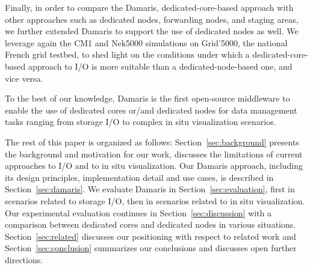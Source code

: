 Finally, in order to compare the Damaris, dedicated-core-based approach with other approaches such as dedicated nodes, forwarding nodes, and staging areas, we further extended Damaris to support the use of dedicated nodes as well. We leverage again the CM1 and Nek5000 simulations on Grid'5000, the national French grid testbed, to shed light on the conditions under which a dedicated-core-based approach to I/O is more suitable than a dedicated-node-based one, and vice versa.

To the best of our knowledge, Damaris is the first open-source middleware to enable the use of dedicated cores or/and dedicated nodes for data management tasks ranging from storage I/O to complex in situ visualization scenarios.

The rest of this paper is organized as follows: Section~\ref{sec:background} presents the background and motivation for our work, discusses the limitations of current approaches to I/O and to in situ visualization. Our Damaris approach, including its design principles, implementation detail and use cases, is described in Section~\ref{sec:damaris}. We evaluate Damaris in Section~\ref{sec:evaluation}, first in scenarios related to storage I/O, then in scenarios related to in situ visualization. Our experimental evaluation continues in Section~\ref{sec:discussion} with a comparison between dedicated cores and dedicated nodes in various situations. Section~\ref{sec:related} discusses our positioning with respect to related work and Section~\ref{sec:conclusion} summarizes our conclusions and discusses open further directions.


